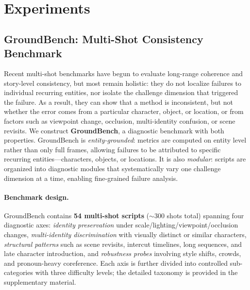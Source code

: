\section{Experiments}

\subsection{GroundBench: Multi-Shot Consistency Benchmark}

Recent multi-shot benchmarks have begun to evaluate long-range coherence and story-level consistency, but most remain holistic: they do not localize failures to individual recurring entities, nor isolate the challenge dimension that triggered the failure. As a result, they can show that a method is inconsistent, but not whether the error comes from a particular character, object, or location, or from factors such as viewpoint change, occlusion, multi-identity confusion, or scene revisits. We construct \textbf{GroundBench}, a diagnostic benchmark with both properties. GroundBench is \emph{entity-grounded}: metrics are computed on entity level rather than only full frames, allowing failures to be attributed to specific recurring entities---characters, objects, or locations. It is also \emph{modular}: scripts are organized into diagnostic modules that systematically vary one challenge dimension at a time, enabling fine-grained failure analysis.

\paragraph{Benchmark design.}
GroundBench contains \textbf{54 multi-shot scripts} ($\sim$300 shots total) spanning four diagnostic axes: \emph{identity preservation} under scale/lighting/viewpoint/occlusion changes, \emph{multi-identity discrimination} with visually distinct or similar characters, \emph{structural patterns} such as scene revisits, intercut timelines, long sequences, and late character introduction, and \emph{robustness probes} involving style shifts, crowds, and pronoun-heavy coreference. Each axis is further divided into controlled sub-categories with three difficulty levels; the detailed taxonomy is provided in the supplementary material.


